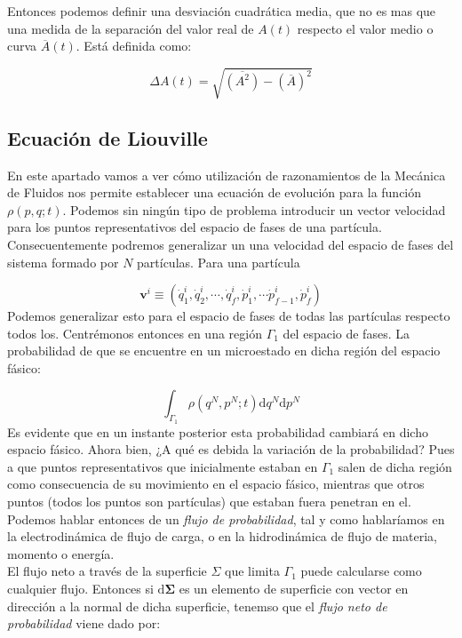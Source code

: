 \documentclass[12pt,a4paper]{article}
\numberwithin{equation}{section}
\numberwithin{figure}{section}
\newcommand{\D}{\mathrm{d}}
\newcommand{\vn}{\mathbf{v}}
\newcommand{\Sigman}{\boldsymbol{\Sigma}}
\theoremstyle{definition}
\begin{document}
Entonces podemos definir una desviación cuadrática media, que no es mas que una medida de la separación del valor real de $A(t)$ respecto el valor medio o curva $\overline{A}(t)$. Está definida como:

\begin{equation}
\Delta A (t) = \sqrt{\overline{(A^2)}-(\overline{A})^2}
\end{equation}

\subsection{Ecuación de Liouville}

En este apartado vamos a ver cómo utilización de razonamientos de la Mecánica de Fluidos nos permite establecer una ecuación de evolución para la función $\rho (p,q;t)$. Podemos sin ningún tipo de problema introducir un vector velocidad para los puntos representativos del espacio de fases de una partícula. Consecuentemente podremos generalizar un una velocidad del espacio de fases del sistema formado por $N$ partículas. Para una partícula

\begin{equation}
\vn^i \equiv (\dot{q}_1^i, \dot{q}_2^i, \cdots, \dot{q}_f^i, \dot{p}_1^i, \cdots \dot{p}_{f-1}^i,\dot{p}_f^i)
\end{equation}
Podemos generalizar esto para el espacio de fases de todas las partículas respecto todos los. Centrémonos entonces en una región $\Gamma_1$ del espacio de fases. La probabilidad de que se encuentre en un microestado en dicha región del espacio fásico:

\begin{equation}
\int_{\Gamma_1} \rho(q^N,p^N;t) \D q^N \D p^N 
\end{equation}
Es evidente que en un instante posterior esta probabilidad cambiará en dicho espacio fásico. Ahora bien, ¿A qué es debida la variación de la probabilidad? Pues a que puntos representativos que inicialmente estaban en $\Gamma_1$ salen de dicha región como consecuencia de su movimiento en el espacio fásico, mientras que otros puntos (todos los puntos son partículas) que estaban fuera penetran en el. Podemos hablar entonces de un \textit{flujo de probabilidad}, tal y como hablaríamos en la electrodinámica de flujo de carga, o en la hidrodinámica de flujo de materia, momento o energía. \\

El flujo neto a través de la superficie $\Sigma$ que limita $\Gamma_1$ puede calcularse como cualquier flujo. Entonces si $\D \Sigman$ es un elemento de superficie con vector en dirección a la normal de dicha superficie, tenemso que el \textit{flujo neto de probabilidad} viene dado por:
\end{document}
